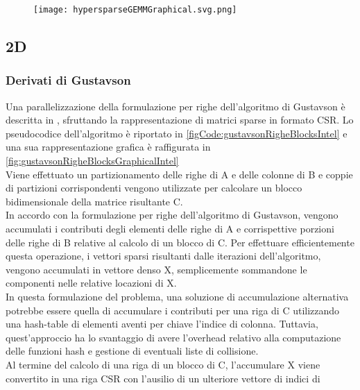 \begin{figure}[h]
  \centering \texttt{[image: hypersparseGEMMGraphical.svg.png]}
  \caption[Rappresentazione grafica del prodotto cartesiano 
   a supporto di hypersparseGEMM ] \decoRule \label{fig:hypersparseGEMMGraphical}
\end{figure}


\subsection{2D}

\subsubsection{Derivati di Gustavson} \label{ssec:gustavsonDerivate}
Una parallelizzazione della formulazione per righe dell'algoritmo di Gustavson è
descritta in \parencite{intelSpGEMMDenseAccumulator}, sfruttando la
rappresentazione di matrici sparse in formato CSR. 
Lo pseudocodice dell'algoritmo è riportato in \ref{figCode:gustavsonRigheBlocksIntel}
e una sua rappresentazione grafica è raffigurata in
\ref{fig:gustavsonRigheBlocksGraphicalIntel}\\
Viene effettuato un partizionamento delle righe di A e delle colonne di B e 
coppie di partizioni corrispondenti vengono utilizzate per calcolare un
blocco bidimensionale della matrice risultante C.\\
In accordo con la formulazione per righe dell'algoritmo di Gustavson, vengono
accumulati i contributi degli elementi \nnz delle righe di A e corrispettive porzioni
delle righe di B relative al calcolo di un blocco di C. 
Per effettuare efficientemente questa operazione, i vettori sparsi risultanti
dalle iterazioni dell'algoritmo, vengono accumulati in vettore denso X, 
semplicemente sommandone le componenti \nnz nelle relative locazioni di X.\\
In questa formulazione del problema, una soluzione di accumulazione 
alternativa potrebbe essere quella di accumulare i contributi per una riga di C 
utilizzando una hash-table di elementi aventi per chiave l'indice di colonna. 
Tuttavia, quest'approccio ha lo svantaggio di avere l'overhead relativo alla 
computazione delle funzioni hash e gestione di eventuali liste di collisione.\\
Al termine del calcolo di una riga di un blocco di C, l'accumulare X viene
convertito in una riga CSR con l'ausilio di un ulteriore vettore di indici di
